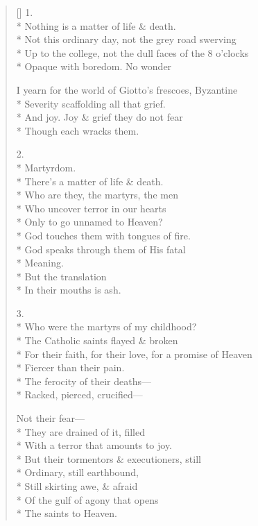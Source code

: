 \label{ch:lives_of_the_saints}
\settowidth{\versewidth}{For their faith, for their love, for a promise of Heaven}
\begin{verse}[\versewidth]
1.\\*
Nothing is a matter of life \& death.\\*
Not this ordinary day, not the grey road swerving\\*
Up to the college, not the dull faces of the 8 o'clocks\\*
Opaque with boredom.   No wonder

I yearn for the world of Giotto's frescoes, Byzantine\\*
Severity scaffolding all that grief.\\*
And joy. Joy \& grief they do not fear\\*
Though each wracks them.

2.\\*
Martyrdom.\\*
There's a matter of life \& death.\\*
Who are they, the martyrs, the men\\*
Who uncover terror in our hearts\\*
Only to go unnamed to Heaven?\\*
God touches them with tongues of fire.\\*
God speaks through them of His fatal\\*
Meaning.\\*
                 But the translation\\*
In their mouths is ash.

3.\\*
Who were the martyrs of my childhood?\\*
The Catholic saints flayed \& broken\\*
For their faith, for their love, for a promise of Heaven\\*
Fiercer than their pain.\\*
The ferocity of their deaths---\\*
Racked, pierced, crucified---

Not their fear---\\*
They are drained of it, filled\\*
With a terror that amounts to joy.\\*
But their tormentors \& executioners, still\\*
Ordinary, still earthbound,\\*
Still skirting awe, \& afraid\\*
Of the gulf of agony that opens\\*
The saints to Heaven.


\end{verse}
